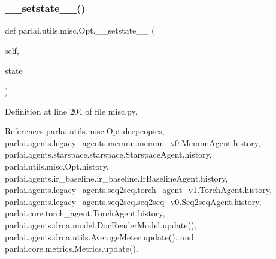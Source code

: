 \mbox{\label{classparlai_1_1utils_1_1misc_1_1Opt_ab9abc2aba6c09db1d6e65744dacb6090}} 
\subsubsection{\texorpdfstring{\+\_\+\+\_\+setstate\+\_\+\+\_\+()}{\_\_setstate\_\_()}}
{\footnotesize\ttfamily def parlai.\+utils.\+misc.\+Opt.\+\_\+\+\_\+setstate\+\_\+\+\_\+ (\begin{DoxyParamCaption}\item[{}]{self,  }\item[{}]{state }\end{DoxyParamCaption})}



Definition at line 204 of file misc.\+py.



References parlai.\+utils.\+misc.\+Opt.\+deepcopies, parlai.\+agents.\+legacy\+\_\+agents.\+memnn.\+memnn\+\_\+v0.\+Memnn\+Agent.\+history, parlai.\+agents.\+starspace.\+starspace.\+Starspace\+Agent.\+history, parlai.\+utils.\+misc.\+Opt.\+history, parlai.\+agents.\+ir\+\_\+baseline.\+ir\+\_\+baseline.\+Ir\+Baseline\+Agent.\+history, parlai.\+agents.\+legacy\+\_\+agents.\+seq2seq.\+torch\+\_\+agent\+\_\+v1.\+Torch\+Agent.\+history, parlai.\+agents.\+legacy\+\_\+agents.\+seq2seq.\+seq2seq\+\_\+v0.\+Seq2seq\+Agent.\+history, parlai.\+core.\+torch\+\_\+agent.\+Torch\+Agent.\+history, parlai.\+agents.\+drqa.\+model.\+Doc\+Reader\+Model.\+update(), parlai.\+agents.\+drqa.\+utils.\+Average\+Meter.\+update(), and parlai.\+core.\+metrics.\+Metrics.\+update().

